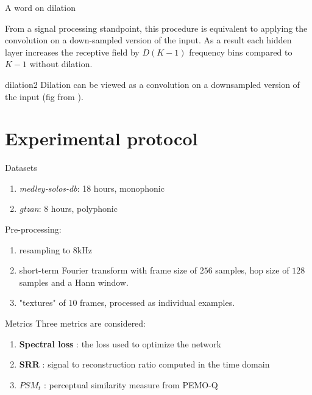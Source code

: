 \documentclass[compress]{beamer}
\begin{document}
\begin{frame}{A word on dilation}
  \begin{minipage}[c]{.4\linewidth}
  From a signal processing standpoint, this procedure is equivalent to applying the convolution on a down-sampled version of the input. As a result each hidden layer increases the receptive field by $D(K-1)$ frequency bins compared to $K-1$ without dilation.
  \end{minipage}
  \begin{minipage}[c]{.55\linewidth}
  \begin{center}\vspace{1cm}
dilation2
Dilation can be viewed as a convolution on a downsampled version of the input (fig from ).
  \end{center}\vspace{1cm}
  \end{minipage}
\end{frame}

\section{Experimental protocol}

\begin{frame}{Datasets}

\begin{enumerate}
  \item \textit{medley-solos-db}: 18 hours, monophonic
  \item \textit{gtzan}: 8 hours, polyphonic
\end{enumerate}

Pre-processing:

\begin{enumerate}
  \item resampling to $8$kHz
  \item short-term Fourier transform with frame size of $256$ samples, hop size of $128$ samples and a Hann window.
  \item "textures" of $10$ frames, processed as individual examples.
\end{enumerate}
\end{frame}

\begin{frame}{Metrics}
Three metrics are considered:
\begin{enumerate}
  \item \textbf{Spectral loss} : the loss used to optimize the network
  \item \textbf{SRR} : signal to reconstruction ratio computed in the time domain
  \item \textbf{$PSM_t$} : perceptual similarity measure from PEMO-Q 
\end{enumerate}
\end{frame}
\end{document}
